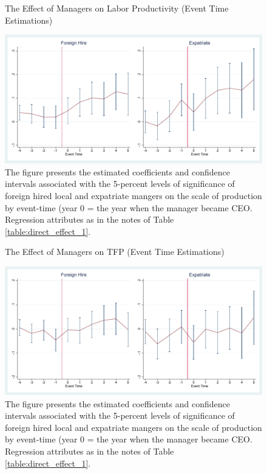 \documentclass[12pt,a4paper]{article}
\begin{document}
\begin{figure}
\center
\caption{The Effect of Managers on Labor Productivity (Event Time Estimations)}
\label{figure:dynamics_lnQL}
\includegraphics[width=15cm]{Regression/gr_lnQL.pdf}
\caption*{The figure presents the estimated coefficients and confidence intervals associated with the 5-percent levels of significance of foreign hired local and expatriate mangers on the scale of production by event-time (year 0 = the year when the manager became CEO. Regression attributes as in the notes of Table \ref{table:direct_effect_1}.}
\end{figure}

\begin{figure}
\caption{The Effect of Managers on TFP (Event Time Estimations)}
\label{figure:dynamics_exporter_5}
\center
\includegraphics[width=15cm]{Regression/gr_TFP.pdf}
\caption*{The figure presents the estimated coefficients and confidence intervals associated with the 5-percent levels of significance of foreign hired local and expatriate mangers on the scale of production by event-time (year 0 = the year when the manager became CEO. Regression attributes as in the notes of Table \ref{table:direct_effect_1}.  }
\end{figure}
\end{document}
